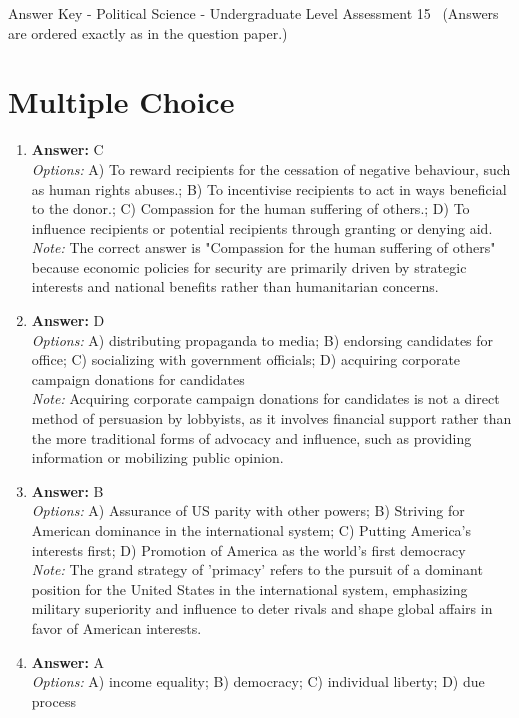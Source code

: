 \documentclass[12pt]{article}
\begin{document}
\begin{center}
Answer Key - Political Science - Undergraduate Level Assessment 15 \
\small (Answers are ordered exactly as in the question paper.)
\end{center}

\section*{Multiple Choice}
\begin{enumerate}[label=\arabic*.]
\item \textbf{Answer:} C
\\ \textit{Options:} A) To reward recipients for the cessation of negative behaviour, such as human rights abuses.; B) To incentivise recipients to act in ways beneficial to the donor.; C) Compassion for the human suffering of others.; D) To influence recipients or potential recipients through granting or denying aid.
\\ \textit{Note:} The correct answer is "Compassion for the human suffering of others" because economic policies for security are primarily driven by strategic interests and national benefits rather than humanitarian concerns.
\item \textbf{Answer:} D
\\ \textit{Options:} A) distributing propaganda to media; B) endorsing candidates for office; C) socializing with government officials; D) acquiring corporate campaign donations for candidates
\\ \textit{Note:} Acquiring corporate campaign donations for candidates is not a direct method of persuasion by lobbyists, as it involves financial support rather than the more traditional forms of advocacy and influence, such as providing information or mobilizing public opinion.
\item \textbf{Answer:} B
\\ \textit{Options:} A) Assurance of US parity with other powers; B) Striving for American dominance in the international system; C) Putting America's interests first; D) Promotion of America as the world's first democracy
\\ \textit{Note:} The grand strategy of 'primacy' refers to the pursuit of a dominant position for the United States in the international system, emphasizing military superiority and influence to deter rivals and shape global affairs in favor of American interests.
\item \textbf{Answer:} A
\\ \textit{Options:} A) income equality; B) democracy; C) individual liberty; D) due process

\end{enumerate}
\end{document}
